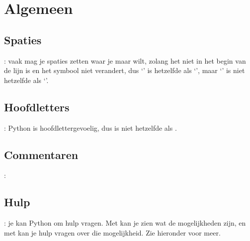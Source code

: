 
\section{Algemeen}
  \subsection{Spaties}: vaak mag je spaties zetten waar je maar wilt, zolang het
  niet in het begin van de lijn is en het symbool niet verandert, dus \newline
  `' is hetzelfde als `', maar `' is
  niet hetzelfde als \newline `'.

  \subsection{Hoofdletters}: Python is hoofdlettergevoelig, dus 
  is niet hetzelfde als .

  \subsection{Commentaren}:\,

  \subsection{Hulp}: je kan Python om hulp vragen. Met  kan je zien wat
  de mogelijkheden zijn, en met  kan je hulp vragen over die
  mogelijkheid. Zie hieronder voor meer.

